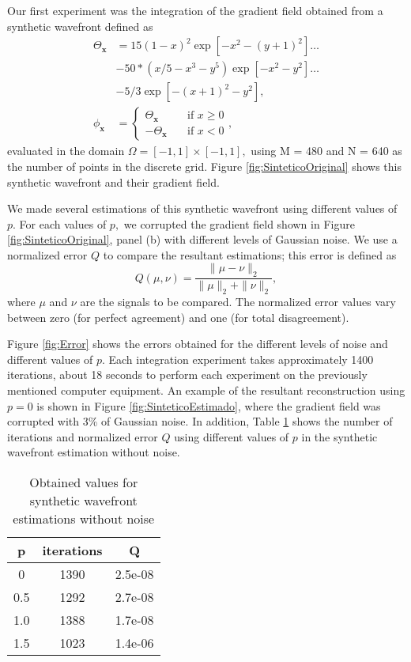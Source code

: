 \documentclass[12pt,letterpaper]{article}
\begin{document}
Our first experiment was the integration of the gradient field obtained from a synthetic wavefront defined as
\begin{equation}\label{eq:sintetico}
	\begin{aligned}
		\Theta_{\mathbf{x}}  &= 15(1-x)^{2}\exp\left[-x^{2} - (y+1)^2\right]\ldots\\  &- 50*\left(x/5 - x^{3} - y^{5}\right)\exp\left[-x^{2} - y^2\right]\ldots\\ 
		&- 5/3\exp\left[-(x+1)^{2} - y^2\right],\\
		\phi_{\mathbf{x}} &=
		\begin{cases}
			\Theta_{\mathbf{x}}       & \quad \text{if } x \geq 0\\
			-\Theta_{\mathbf{x}}       & \quad \text{if } x < 0
		\end{cases},
	\end{aligned}
\end{equation}
evaluated in the domain $\Omega = [-1,1]\times[-1,1],$ using M = 480 and N = 640 as the number of points in the discrete grid. Figure \ref{fig:SinteticoOriginal} shows this synthetic wavefront and their gradient field.

We made several estimations of this synthetic wavefront using different values of $p.$ For each values of $p,$ we corrupted the gradient field shown in Figure \ref{fig:SinteticoOriginal}, panel (b) with different levels of Gaussian noise. We use a normalized error $Q$ to compare the resultant estimations; this error is defined as~\cite{Perlin2016} \[Q\left(\mu,\nu\right) = \frac{\| \mu - \nu\|_{2}}{\| \mu\|_{2} + \|\nu\|_{2}},\] where $\mu$ and $\nu$ are the signals to be compared. The normalized error values vary between zero (for perfect agreement) and one (for total disagreement). 

Figure \ref{fig:Error} shows the errors obtained for the different levels of noise and different values of $p.$ Each integration experiment takes approximately 1400 iterations, about 18 seconds to perform each experiment on the previously mentioned computer equipment. An example of the resultant reconstruction using $p = 0$ is shown in Figure \ref{fig:SinteticoEstimado}, where the gradient field was corrupted with 3\% of Gaussian noise. In addition, Table \ref{tab:tabla} shows the number of iterations and normalized error $Q$ using different values of $p$ in the synthetic wavefront estimation without noise.
\begin{table}[h]
	\centering 
	\caption{Obtained values for synthetic wavefront estimations without noise}\label{tab:tabla}
	\begin{tabular}{ c c c }
		\hline
		p& iterations&Q\\
		\hline
		0 & 1390 & 2.5e-08 \\
		0.5 &1292 & 2.7e-08 \\
		1.0 &1388 & 1.7e-08 \\
		1.5 &1023 & 1.4e-06
	\end{tabular}
\end{table}
\end{document}
